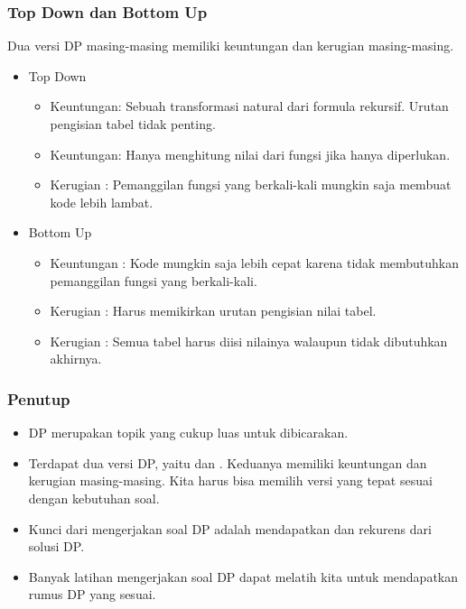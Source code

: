 \begin{frame}
\frametitle{Top Down dan Bottom Up}
Dua versi DP masing-masing memiliki keuntungan dan kerugian masing-masing.
\begin{itemize}
  \item Top Down
  \begin{itemize}
    \item Keuntungan: Sebuah transformasi natural dari formula rekursif. Urutan pengisian tabel tidak penting.
    \item Keuntungan: Hanya menghitung nilai dari fungsi jika hanya diperlukan.
    \item Kerugian : Pemanggilan fungsi yang berkali-kali mungkin saja membuat kode lebih lambat.
  \end{itemize}
  \item Bottom Up
  \begin{itemize}
    \item Keuntungan : Kode mungkin saja lebih cepat karena tidak membutuhkan pemanggilan fungsi yang berkali-kali.
    \item Kerugian : Harus memikirkan urutan pengisian nilai tabel. 
    \item Kerugian : Semua tabel harus diisi nilainya walaupun tidak dibutuhkan akhirnya.
  \end{itemize}
\end{itemize}
\end{frame}

\begin{frame}
\frametitle{Penutup}
\begin{itemize}
  \item DP merupakan topik yang cukup luas untuk dibicarakan.
  \item Terdapat dua versi DP, yaitu  dan . Keduanya memiliki keuntungan dan kerugian masing-masing. Kita harus bisa memilih versi yang tepat sesuai dengan kebutuhan soal.
  \item Kunci dari mengerjakan soal DP adalah mendapatkan  dan rekurens dari solusi DP. 
  \item Banyak latihan mengerjakan soal DP dapat melatih kita untuk mendapatkan rumus DP yang sesuai.
\end{itemize}
\end{frame}


